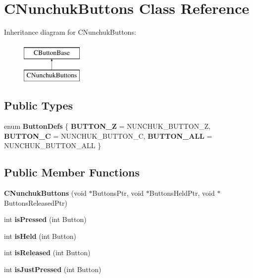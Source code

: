 \hypertarget{class_c_nunchuk_buttons}{\section{\-C\-Nunchuk\-Buttons \-Class \-Reference}
\label{class_c_nunchuk_buttons}
}
\-Inheritance diagram for \-C\-Nunchuk\-Buttons\-:\begin{figure}[H]
\begin{center}
\leavevmode
\includegraphics[height=2.000000cm]{class_c_nunchuk_buttons}
\end{center}
\end{figure}
\subsection*{\-Public \-Types}
\begin{DoxyCompactItemize}
\item 
enum {\bfseries \-Button\-Defs} \{ {\bfseries \-B\-U\-T\-T\-O\-N\-\_\-\-Z} =  \-N\-U\-N\-C\-H\-U\-K\-\_\-\-B\-U\-T\-T\-O\-N\-\_\-\-Z, 
{\bfseries \-B\-U\-T\-T\-O\-N\-\_\-\-C} =  \-N\-U\-N\-C\-H\-U\-K\-\_\-\-B\-U\-T\-T\-O\-N\-\_\-\-C, 
{\bfseries \-B\-U\-T\-T\-O\-N\-\_\-\-A\-L\-L} =  \-N\-U\-N\-C\-H\-U\-K\-\_\-\-B\-U\-T\-T\-O\-N\-\_\-\-A\-L\-L
 \}
\end{DoxyCompactItemize}
\subsection*{\-Public \-Member \-Functions}
\begin{DoxyCompactItemize}
\item 
\hypertarget{class_c_nunchuk_buttons_a9ba6eadd235b5078f8d1b751488b7002}{{\bfseries \-C\-Nunchuk\-Buttons} (void $\ast$\-Buttons\-Ptr, void $\ast$\-Buttons\-Held\-Ptr, void $\ast$\-Buttons\-Released\-Ptr)}\label{class_c_nunchuk_buttons_a9ba6eadd235b5078f8d1b751488b7002}

\item 
\hypertarget{class_c_button_base_a0d4758b9e756a8c3c2bb39b907ea9170}{int {\bfseries is\-Pressed} (int \-Button)}\label{class_c_button_base_a0d4758b9e756a8c3c2bb39b907ea9170}

\item 
\hypertarget{class_c_button_base_a67e38daead9d22e33f6a3d85902d1f98}{int {\bfseries is\-Held} (int \-Button)}\label{class_c_button_base_a67e38daead9d22e33f6a3d85902d1f98}

\item 
\hypertarget{class_c_button_base_a575dee487bcca1abf29c1084dfdd5bb8}{int {\bfseries is\-Released} (int \-Button)}\label{class_c_button_base_a575dee487bcca1abf29c1084dfdd5bb8}

\item 
\hypertarget{class_c_button_base_ab74fd21217c5e379a613b7474af4f9b8}{int {\bfseries is\-Just\-Pressed} (int \-Button)}\label{class_c_button_base_ab74fd21217c5e379a613b7474af4f9b8}

\end{DoxyCompactItemize}
